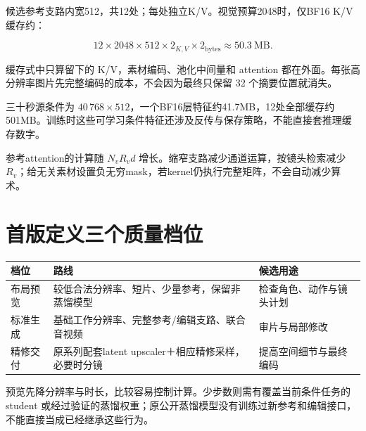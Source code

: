 候选参考支路内宽512，共12处；每处独立K/V。视觉预算2048时，仅BF16 K/V缓存约：

\[
12\times2048\times512\times2_{K,V}\times2_{\mathrm{bytes}}
\approx50.3\ \mathrm{MB}.
\]

缓存式中只算留下的 K/V，素材编码、池化中间量和 attention 都在外面。每张高分辨率图片先完整编码的成本，不会因为最终只保留 32 个摘要位置就消失。

三十秒源条件为 \(40\,768\times512\)，一个BF16层特征约41.7MB，12处全部缓存约501MB。训练时这些可学习条件特征还涉及反传与保存策略，不能直接套推理缓存数字。

参考attention的计算随 \(N_vR_vd\) 增长。缩窄支路减少通道运算，按镜头检索减少 \(R_v\)；给无关素材设置负无穷mask，若kernel仍执行完整矩阵，不会自动减少算术。

\section{首版定义三个质量档位}\label{seedance-m26-ux9996ux7248ux5b9aux4e49ux4e09ux4e2aux8d28ux91cfux6863ux4f4d}

{\def\LTcaptype{table} %
\small\setlength{\tabcolsep}{3pt}\renewcommand{\arraystretch}{1.18}
\begin{longtable}[]{@{}
  >{\raggedright\arraybackslash}p{}
  >{\raggedright\arraybackslash}p{}
  >{\raggedright\arraybackslash}p{}@{}}
\toprule\noalign{}
\begin{minipage}[b]{\linewidth}\raggedright
档位
\end{minipage} & \begin{minipage}[b]{\linewidth}\raggedright
路线
\end{minipage} & \begin{minipage}[b]{\linewidth}\raggedright
候选用途
\end{minipage} \\
\midrule\noalign{}
\endhead
\bottomrule\noalign{}
\endlastfoot
布局预览 & 较低合法分辨率、短片、少量参考，保留非蒸馏模型 & 检查角色、动作与镜头计划 \\
标准生成 & 基础工作分辨率、完整参考/编辑支路、联合音视频 & 审片与局部修改 \\
精修交付 & 原系列配套latent upscaler＋相应精修采样，必要时分镜 & 提高空间细节与最终编码 \\
\end{longtable}
}

预览先降分辨率与时长，比较容易控制计算。少步数则需有覆盖当前条件任务的 student 或经过验证的蒸馏权重；原公开蒸馏模型没有训练过新参考和编辑接口，不能直接当成已经继承这些行为。

